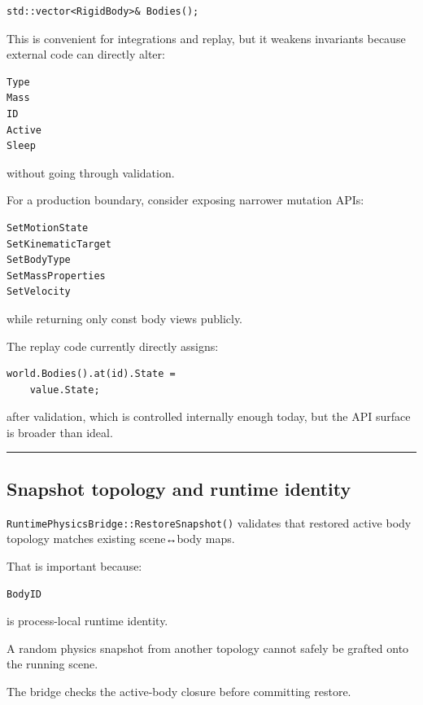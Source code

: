 \begin{verbatim}
std::vector<RigidBody>& Bodies();
\end{verbatim}

This is convenient for integrations and replay, but it weakens invariants because external code can directly alter:

\begin{verbatim}
Type
Mass
ID
Active
Sleep
\end{verbatim}

without going through validation.

For a production boundary, consider exposing narrower mutation APIs:

\begin{verbatim}
SetMotionState
SetKinematicTarget
SetBodyType
SetMassProperties
SetVelocity
\end{verbatim}

while returning only const body views publicly.

The replay code currently directly assigns:

\begin{verbatim}
world.Bodies().at(id).State =
    value.State;
\end{verbatim}

after validation, which is controlled internally enough today, but the API surface is broader than ideal.

\begin{center}\rule{0.5\linewidth}{0.5pt}\end{center}

\subsection{Snapshot topology and runtime identity}\label{06-engine-ii-ch038-snapshot-topology-and-runtime-identity}

\texttt{RuntimePhysicsBridge::RestoreSnapshot()} validates that restored active body topology matches existing scene↔body maps.

That is important because:

\begin{verbatim}
BodyID
\end{verbatim}

is process-local runtime identity.

A random physics snapshot from another topology cannot safely be grafted onto the running scene.

The bridge checks the active-body closure before committing restore.

